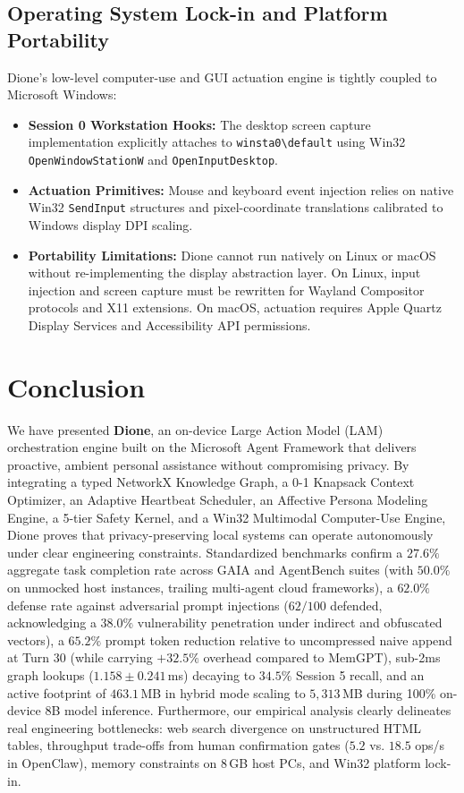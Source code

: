 \documentclass[conference,a4paper]{IEEEtran}
\begin{document}
\subsection{Operating System Lock-in and Platform Portability}
Dione's low-level computer-use and GUI actuation engine is tightly coupled to Microsoft Windows:
\begin{itemize}
    \item \textbf{Session 0 Workstation Hooks:} The desktop screen capture implementation explicitly attaches to \texttt{winsta0\textbackslash default} using Win32 \texttt{OpenWindowStationW} and \texttt{OpenInputDesktop}.
    \item \textbf{Actuation Primitives:} Mouse and keyboard event injection relies on native Win32 \texttt{SendInput} structures and pixel-coordinate translations calibrated to Windows display DPI scaling.
    \item \textbf{Portability Limitations:} Dione cannot run natively on Linux or macOS without re-implementing the display abstraction layer. On Linux, input injection and screen capture must be rewritten for Wayland Compositor protocols and X11 extensions. On macOS, actuation requires Apple Quartz Display Services and Accessibility API permissions.
\end{itemize}

\section{Conclusion}

We have presented \textbf{Dione}, an on-device Large Action Model (LAM) orchestration engine built on the Microsoft Agent Framework that delivers proactive, ambient personal assistance without compromising privacy. By integrating a typed NetworkX Knowledge Graph, a 0-1 Knapsack Context Optimizer, an Adaptive Heartbeat Scheduler, an Affective Persona Modeling Engine, a 5-tier Safety Kernel, and a Win32 Multimodal Computer-Use Engine, Dione proves that privacy-preserving local systems can operate autonomously under clear engineering constraints. Standardized benchmarks confirm a $27.6\%$ aggregate task completion rate across GAIA and AgentBench suites (with $50.0\%$ on unmocked host instances, trailing multi-agent cloud frameworks), a $62.0\%$ defense rate against adversarial prompt injections ($62/100$ defended, acknowledging a $38.0\%$ vulnerability penetration under indirect and obfuscated vectors), a $65.2\%$ prompt token reduction relative to uncompressed naive append at Turn 30 (while carrying $+32.5\%$ overhead compared to MemGPT), sub-2ms graph lookups ($1.158 \pm 0.241$\,ms) decaying to $34.5\%$ Session 5 recall, and an active footprint of $463.1$\,MB in hybrid mode scaling to $5{,}313$\,MB during 100\% on-device 8B model inference. Furthermore, our empirical analysis clearly delineates real engineering bottlenecks: web search divergence on unstructured HTML tables, throughput trade-offs from human confirmation gates ($5.2$ vs. $18.5$ ops/s in OpenClaw), memory constraints on 8\,GB host PCs, and Win32 platform lock-in.
\end{document}
